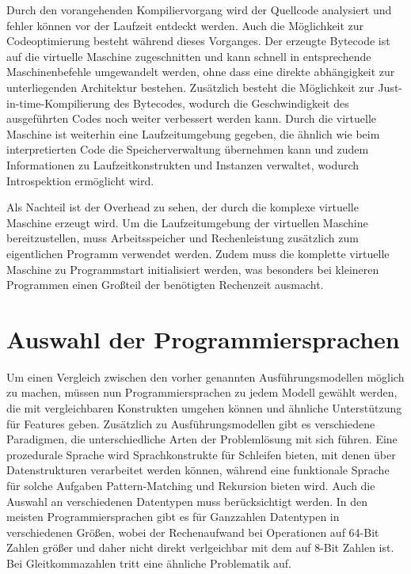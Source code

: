 \documentclass[11pt, parskip=half]{scrartcl}       %
\begin{document}
Durch den vorangehenden Kompiliervorgang wird der Quellcode analysiert und fehler können vor der Laufzeit entdeckt werden.
Auch die Möglichkeit zur Codeoptimierung besteht während dieses Vorganges.
Der erzeugte Bytecode ist auf die virtuelle Maschine zugeschnitten und kann schnell in entsprechende Maschinenbefehle umgewandelt werden, ohne dass eine direkte abhängigkeit zur unterliegenden Architektur bestehen.
Zusätzlich besteht die Möglichkeit zur Just-in-time-Kompilierung des Bytecodes, wodurch die Geschwindigkeit des ausgeführten Codes noch weiter verbessert werden kann.
Durch die virtuelle Maschine ist weiterhin eine Laufzeitumgebung gegeben, die ähnlich wie beim interpretierten Code die Speicherverwaltung übernehmen kann und zudem Informationen zu Laufzeitkonstrukten und Instanzen verwaltet, wodurch Introspektion ermöglicht wird.

Als Nachteil ist der Overhead zu sehen, der durch die komplexe virtuelle Maschine erzeugt wird.
Um die Laufzeitumgebung der virtuellen Maschine bereitzustellen, muss Arbeitsspeicher und Rechenleistung zusätzlich zum eigentlichen Programm verwendet werden.
Zudem muss die komplette virtuelle Maschine zu Programmstart initialisiert werden, was besonders bei kleineren Programmen einen Großteil der benötigten Rechenzeit ausmacht.


\section{Auswahl der Programmiersprachen}

Um einen Vergleich zwischen den vorher genannten Ausführungsmodellen möglich zu machen, müssen nun Programmiersprachen zu jedem Modell gewählt werden, die mit vergleichbaren Konstrukten umgehen können und ähnliche Unterstützung für Features geben.
Zusätzlich zu Ausführungsmodellen gibt es verschiedene Paradigmen, die unterschiedliche Arten der Problemlösung mit sich führen.
Eine prozedurale Sprache wird Sprachkonstrukte für Schleifen bieten, mit denen über Datenstrukturen verarbeitet werden können, während eine funktionale Sprache für solche Aufgaben Pattern-Matching und Rekursion bieten wird.
Auch die Auswahl an verschiedenen Datentypen muss berücksichtigt werden.
In den meisten Programmiersprachen gibt es für Ganzzahlen Datentypen in verschiedenen Größen, wobei der Rechenaufwand bei Operationen auf 64-Bit Zahlen größer und daher nicht direkt verlgeichbar mit dem auf 8-Bit Zahlen ist. Bei Gleitkommazahlen tritt eine ähnliche Problematik auf.
\end{document}
